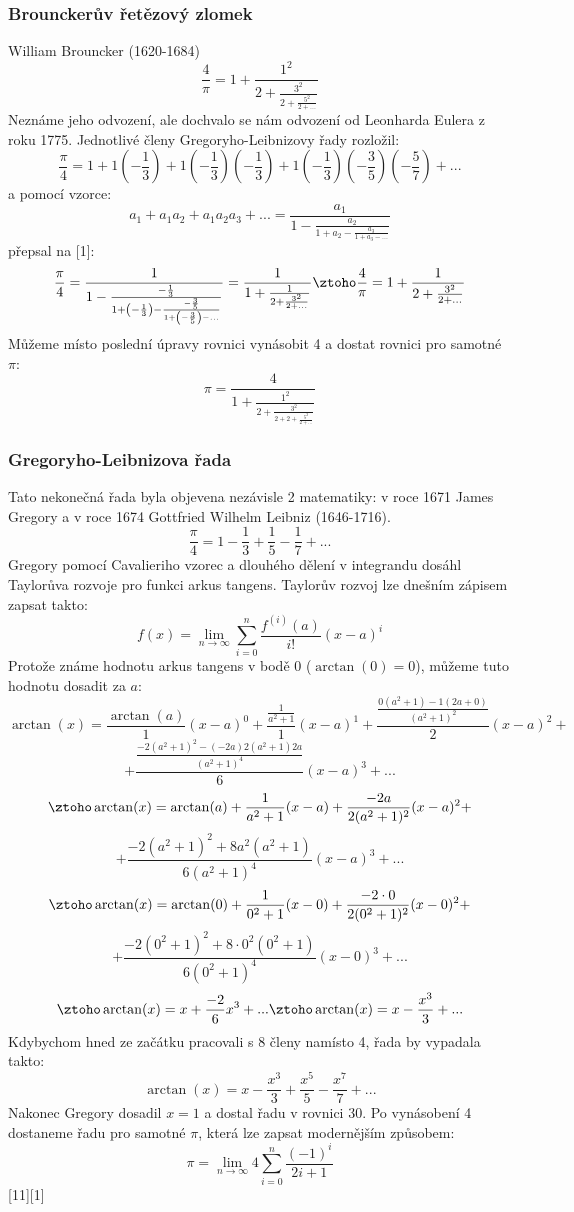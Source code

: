 \documentclass[rocnikovka]{gzwroc} %
\begin{document}
\subsubsection{Brounckerův řetězový zlomek}
William Brouncker (1620-1684)
\begin{equation}
\frac{4}{\pi}=1+\frac{1^2}{2+\frac{3^2}{2+\frac{5^2}{2+...}}}
\end{equation}
Neznáme jeho odvození, ale dochvalo se nám odvození od Leonharda Eulera z roku 1775. Jednotlivé členy Gregoryho-Leibnizovy řady rozložil:
$$
\frac{\pi}{4}=1+1\left(-\frac{1}{3}\right)+1\left(-\frac{1}{3}\right)\left(-\frac{1}{3}\right)+1\left(-\frac{1}{3}\right)\left(-\frac{3}{5}\right)\left(-\frac{5}{7}\right)+...
$$
a pomocí vzorce:
$$
a_1+a_1a_2+a_1a_2a_3+...=\frac{a_1}{1-\frac{a_2}{1+a_2-\frac{a_3}{1+a_3-...}}}
$$
přepsal na [1]:
$$
\frac{\pi}{4}=\frac{1}{1-\frac{-\frac{1}{3}}{1+\left(-\frac{1}{3}\right)-\frac{-\frac{3}{5}}{1+\left(-\frac{3}{5}\right)-...}}}=\frac{1}{1+\frac{1}{2+\frac{3^2}{2+...}}} \ztoho \frac{4}{\pi}=1+\frac{1}{2+\frac{3^2}{2+...}}
$$
Můžeme místo poslední úpravy rovnici vynásobit 4 a dostat rovnici pro samotné $\pi$:
\begin{equation}
\pi=\frac{4}{1+\frac{1^2}{2+\frac{3^2}{2+2+\frac{5^2}{2+...}}}}
\end{equation}
\subsubsection{Gregoryho-Leibnizova řada}
Tato nekonečná řada byla objevena nezávisle 2 matematiky: v roce 1671 James Gregory a v roce 1674 Gottfried Wilhelm Leibniz (1646-1716).
\begin{equation}
\frac{\pi}{4}=1-\frac{1}{3}+\frac{1}{5}-\frac{1}{7}+...
\end{equation}
Gregory pomocí Cavalieriho vzorec a dlouhého dělení v integrandu dosáhl Taylorůva rozvoje pro funkci arkus tangens. Taylorův rozvoj lze dnešním zápisem zapsat takto:
$$
f(x)=\lim_{n\to\infty} \sum_{i=0}^{n} \frac{f^{(i)}(a)}{i!}(x-a)^i
$$
Protože známe hodnotu arkus tangens v bodě 0 ($\arctan(0)=0$), můžeme tuto hodnotu dosadit za $a$:
$$
\arctan(x)=\frac{\arctan(a)}{1}(x-a)^0+\frac{\frac{1}{a^2+1}}{1}(x-a)^1+\frac{\frac{0(a^2+1)-1(2a+0)}{(a^2+1)^2}}{2}(x-a)^2+
$$
$$
+\frac{\frac{-2(a^2+1)^2-(-2a)2(a^2+1)2a}{(a^2+1)^4}}{6}(x-a)^3+...
$$
$$
\ztoho \arctan(x)=\arctan(a)+\frac{1}{a^2+1}(x-a)+\frac{-2a}{2(a^2+1)^2}(x-a)^2+
$$
$$
+\frac{-2(a^2+1)^2+8a^2(a^2+1)}{6(a^2+1)^4}(x-a)^3+...
$$
$$
\ztoho \arctan(x)=\arctan(0)+\frac{1}{0^2+1}(x-0)+\frac{-2\cdot0}{2(0^2+1)^2}(x-0)^2+
$$
$$
+\frac{-2(0^2+1)^2+8\cdot0^2(0^2+1)}{6(0^2+1)^4}(x-0)^3+...
$$
$$
\ztoho \arctan(x)=x+\frac{-2}{6}x^3+...\ztoho \arctan(x)=x-\frac{x^3}{3}+...
$$
Kdybychom hned ze začátku pracovali s 8 členy namísto 4, řada by vypadala takto:
$$
\arctan(x)=x-\frac{x^3}{3}+\frac{x^5}{5}-\frac{x^7}{7}+...
$$
Nakonec Gregory dosadil $x=1$ a dostal řadu v rovnici 30. Po vynásobení 4 dostaneme řadu pro samotné $\pi$, která lze zapsat modernějším způsobem:
\begin{equation}
\pi=\lim_{n\to\infty} 4\sum_{i=0}^{n} \frac{(-1)^i}{2i+1}
\end{equation}
[11][1]
\end{document}
